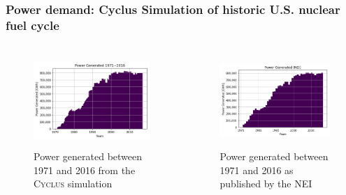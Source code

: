 \begin{frame}
  \frametitle{Power demand: Cyclus Simulation of historic U.S. nuclear fuel cycle}
  \begin{columns}
    \column[t]{5cm}
    \begin{figure}[htbp!]
      \begin{center}
        \includegraphics[height=3.5cm]{images/power_gen_cyclus}
      \end{center}
            \caption{Power generated between 1971 and 2016 from the \textsc{Cyclus} simulation}
    \end{figure}
    \column[t]{5cm}
    \begin{figure}[htbp!]
      \begin{center}
        \includegraphics[height=3.5cm]{images/power_gen_nei}
      \end{center}
            \caption{Power generated between 1971 and 2016 as published by the NEI \cite{nei_u.s._2018}}
    \end{figure}
  \end{columns}
\end{frame}
